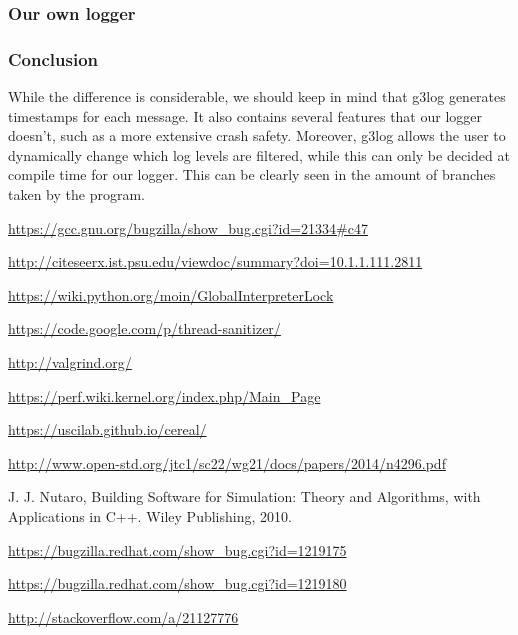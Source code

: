 \documentclass[8pt,a4paper]{report}
\begin{document}
\subsubsection{Our own logger}

\subsubsection{Conclusion}
While the difference is considerable, we should keep in mind that g3log generates timestamps for each message. It also contains several features that our logger doesn't, such as a more extensive crash safety. Moreover, g3log allows the user to dynamically change which log levels are filtered, while this can only be decided at compile time for our logger. This can be clearly seen in the amount of branches taken by the program.

\begin{thebibliography}{1}


   \url{https://gcc.gnu.org/bugzilla/show_bug.cgi?id=21334#c47}

   \url{http://citeseerx.ist.psu.edu/viewdoc/summary?doi=10.1.1.111.2811}
  
   \url{https://wiki.python.org/moin/GlobalInterpreterLock}
  
   \url{https://code.google.com/p/thread-sanitizer/}
  
   \url{http://valgrind.org/}
  
   \url{https://perf.wiki.kernel.org/index.php/Main_Page}
  
   \url{https://uscilab.github.io/cereal/}
  
   \url{http://www.open-std.org/jtc1/sc22/wg21/docs/papers/2014/n4296.pdf}
  
    J. J. Nutaro, Building Software for Simulation: Theory and Algorithms, with
Applications in C++. Wiley Publishing, 2010.

    \url{https://bugzilla.redhat.com/show_bug.cgi?id=1219175}
  
    \url{https://bugzilla.redhat.com/show_bug.cgi?id=1219180}

   \url{http://stackoverflow.com/a/21127776}

  \end{thebibliography}
\end{document}

